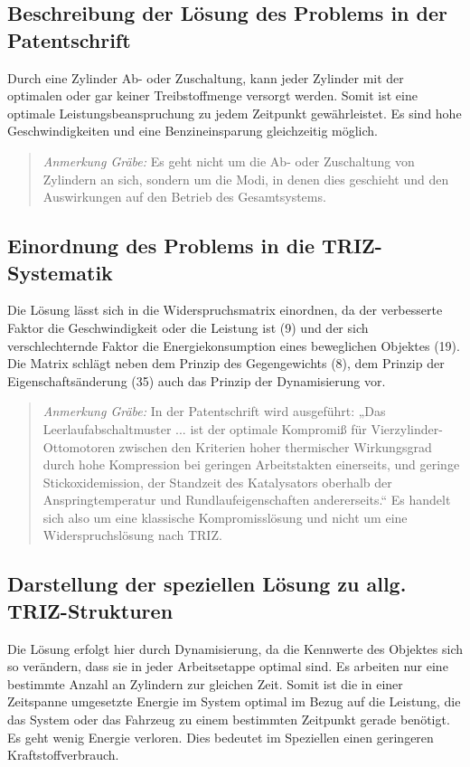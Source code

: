 \documentclass[11pt,a4paper]{article}
\newcommand{\HGG}[1]{\begin{quote} \emph{Anmerkung Gräbe:} #1  \end{quote}}
\begin{document}
\subsection{Beschreibung der Lösung des Problems in der Patentschrift}
Durch eine Zylinder Ab- oder Zuschaltung, kann jeder Zylinder mit der
optimalen oder gar keiner Treibstoffmenge versorgt werden.  Somit ist eine
optimale Leistungsbeanspruchung zu jedem Zeitpunkt gewährleistet.  Es sind
hohe Geschwindigkeiten und eine Benzineinsparung gleichzeitig möglich.

\HGG{Es geht nicht um die  Ab- oder Zuschaltung von Zylindern an sich, sondern
um die Modi, in denen dies geschieht und den Auswirkungen auf den Betrieb des
Gesamtsystems. }

\subsection{Einordnung des Problems in die TRIZ-Systematik}
Die Lösung lässt sich in die Widerspruchsmatrix einordnen, da der verbesserte
Faktor die Geschwindigkeit oder die Leistung ist (9) und der sich
verschlechternde Faktor die Energiekonsumption eines beweglichen Objektes
(19). Die Matrix schlägt neben dem Prinzip des Gegengewichts (8), dem Prinzip
der Eigenschaftsänderung (35) auch das Prinzip der Dynamisierung vor.

\HGG{In der Patentschrift wird ausgeführt: „Das Leerlaufabschaltmuster ... ist
  der optimale Kompromiß für Vierzylinder-Ottomotoren zwischen den Kriterien
  hoher thermischer Wirkungsgrad durch hohe Kompression bei geringen
  Arbeitstakten einerseits, und geringe Stickoxidemission, der Standzeit des
  Katalysators oberhalb der Anspringtemperatur und Rundlaufeigenschaften
  andererseits.“ Es handelt sich also um eine klassische Kompromisslösung und
  nicht um eine Widerspruchslösung nach TRIZ.}

\subsection{Darstellung der speziellen Lösung zu allg. TRIZ-Strukturen}
 
Die Lösung erfolgt hier durch Dynamisierung, da die Kennwerte des Objektes
sich so verändern, dass sie in jeder Arbeitsetappe optimal sind. Es arbeiten
nur eine bestimmte Anzahl an Zylindern zur gleichen Zeit. Somit ist die in
einer Zeitspanne umgesetzte Energie im System optimal im Bezug auf die
Leistung, die das System oder das Fahrzeug zu einem bestimmten Zeitpunkt
gerade benötigt. Es geht wenig Energie verloren. Dies bedeutet im Speziellen
einen geringeren Kraftstoffverbrauch.
\end{document}
